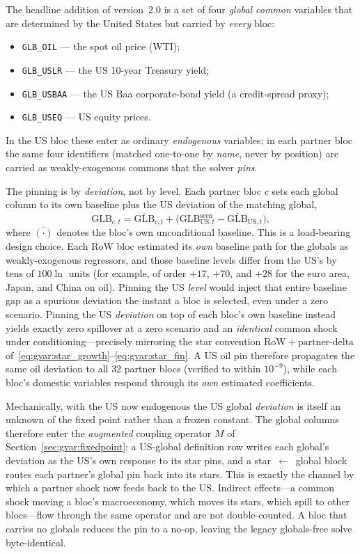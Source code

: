 \documentclass[11pt]{article}
\theoremstyle{definition}
\theoremstyle{remark}
\begin{document}
The headline addition of version~2.0 is a set of four \emph{global common}
variables that are determined by the United States but carried by \emph{every}
bloc:
\begin{itemize}
  \item \texttt{GLB\_OIL} --- the spot oil price (WTI);
  \item \texttt{GLB\_USLR} --- the US 10-year Treasury yield;
  \item \texttt{GLB\_USBAA} --- the US Baa corporate-bond yield (a credit-spread
    proxy);
  \item \texttt{GLB\_USEQ} --- US equity prices.
\end{itemize}
In the US bloc these enter as ordinary \emph{endogenous} variables; in each
partner bloc the same four identifiers (matched one-to-one by \emph{name}, never
by position) are carried as weakly-exogenous commons that the solver \emph{pins}.

The pinning is by \emph{deviation}, not by level. Each partner bloc $c$ sets each
global column to its own baseline plus the US deviation of the matching global,
\begin{equation}\label{eq:gvar:globalpin}
  \widehat{\text{GLB}}_{c,t}
  = \bar{\text{GLB}}_{c,t}
    + \bigl(\text{GLB}^{\text{scen}}_{\text{US},t}
      - \bar{\text{GLB}}_{\text{US},t}\bigr),
\end{equation}
where $\bar{(\cdot)}$ denotes the bloc's own unconditional baseline. This is a
load-bearing design choice. Each RoW bloc estimated its \emph{own} baseline path
for the globals as weakly-exogenous regressors, and those baseline levels differ
from the US's by tens of $100\ln$ units (for example, of order $+17$, $+70$, and
$+28$ for the euro area, Japan, and China on oil). Pinning the US \emph{level}
would inject that entire baseline gap as a spurious deviation the instant a bloc
is selected, even under a zero scenario. Pinning the US \emph{deviation} on top
of each bloc's own baseline instead yields exactly zero spillover at a zero
scenario and an \emph{identical} common shock under conditioning---precisely
mirroring the star convention $\bar{\text{RoW}} + \text{partner-delta}$
of~\eqref{eq:gvar:star_growth}--\eqref{eq:gvar:star_fin}. A US oil pin therefore
propagates the same oil deviation to all $32$ partner blocs (verified to within
$10^{-9}$), while each bloc's domestic variables respond through its \emph{own}
estimated coefficients.

Mechanically, with the US now endogenous the US global \emph{deviation} is itself
an unknown of the fixed point rather than a frozen constant. The global columns
therefore enter the \emph{augmented} coupling operator $M$ of
Section~\ref{sec:gvar:fixedpoint}: a US-global definition row writes each
global's deviation as the US's own response to its star pins, and a
star~$\leftarrow$~global block routes each partner's global pin back into its
stars. This is exactly the channel by which a partner shock now feeds back to the
US. Indirect effects---a common shock moving a bloc's macroeconomy, which moves
its stars, which spill to other blocs---flow through the same operator and are
not double-counted. A bloc that carries no globals reduces the pin to a no-op,
leaving the legacy globals-free solve byte-identical.
\end{document}
